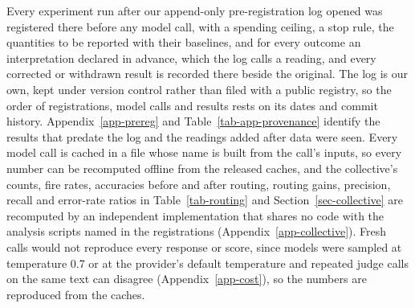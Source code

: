 Every experiment run after our append-only pre-registration log opened was registered there
before any model call, with a spending ceiling, a stop rule, the quantities to be reported with
their baselines, and for every outcome an interpretation declared in advance, which the log calls
a reading, and every corrected or withdrawn result is recorded there beside the original.
The log is our own, kept under version control rather than filed with a public registry, so
the order of registrations, model calls and results rests on its dates and commit history.
Appendix~\ref{app-prereg} and Table~\ref{tab-app-provenance} identify the results that predate
the log and the readings added after data were seen.
Every model call is cached in a file whose name is built from the call's inputs, so every number
can be recomputed offline from the released caches, and the collective's counts, fire rates,
accuracies before and after routing, routing gains, precision, recall and error-rate ratios in
Table~\ref{tab-routing} and Section~\ref{sec-collective} are recomputed by an independent
implementation that shares no code with the analysis scripts named in the registrations
(Appendix~\ref{app-collective}).
Fresh calls would not reproduce every response or score, since models were sampled at temperature 0.7 or at
the provider's default temperature and repeated judge calls on the same text can disagree
(Appendix~\ref{app-cost}), so the numbers are reproduced from the caches.
